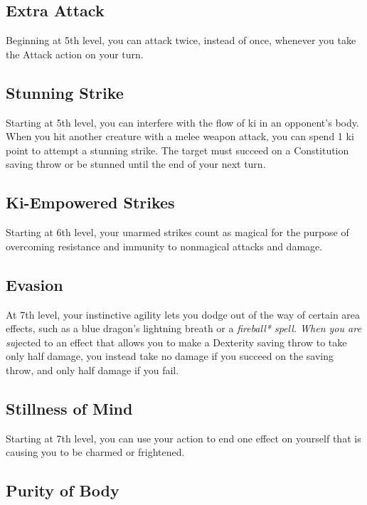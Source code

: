 \subsection{Extra Attack}

Beginning at 5th level, you can attack twice, instead of once, whenever you take the Attack action on your turn.

\subsection{Stunning Strike}

Starting at 5th level, you can interfere with the flow of ki in an opponent’s body. When you hit another creature with a melee weapon attack, you can spend 1 ki point to attempt a stunning strike. The target must succeed on a Constitution saving throw or be stunned until the end of your next turn.

\subsection{Ki-Empowered Strikes}

Starting at 6th level, your unarmed strikes count as magical for the purpose of overcoming resistance and immunity to nonmagical attacks and damage.

\subsection{Evasion}

At 7th level, your instinctive agility lets you dodge out of the way of certain area effects, such as a blue dragon’s lightning breath or a \textit{fireball* spell. When you are su}jected to an effect that allows you to make a Dexterity saving throw to take only half damage, you instead take no damage if you succeed on the saving throw, and only half damage if you fail.

\subsection{Stillness of Mind}

Starting at 7th level, you can use your action to end one effect on yourself that is causing you to be charmed or frightened.

\subsection{Purity of Body}

